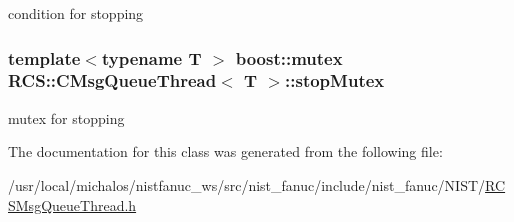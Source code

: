 condition for stopping \hypertarget{classRCS_1_1CMsgQueueThread_a45804784a5293cc44bec276842b8eb0a}{
\subsubsection[{stop\-Mutex}]{\setlength{\rightskip}{0pt plus 5cm}template$<$typename T $>$ boost\-::mutex {\bf R\-C\-S\-::\-C\-Msg\-Queue\-Thread}$<$ T $>$\-::stop\-Mutex\hspace{0.3cm}{\ttfamily [protected]}}}\label{classRCS_1_1CMsgQueueThread_a45804784a5293cc44bec276842b8eb0a}
mutex for stopping 

The documentation for this class was generated from the following file\-:\begin{DoxyCompactItemize}
\item 
/usr/local/michalos/nistfanuc\-\_\-ws/src/nist\-\_\-fanuc/include/nist\-\_\-fanuc/\-N\-I\-S\-T/\hyperlink{RCSMsgQueueThread_8h}{R\-C\-S\-Msg\-Queue\-Thread.\-h}\end{DoxyCompactItemize}
